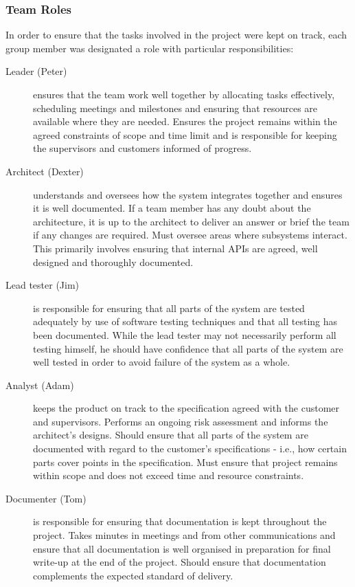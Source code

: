 \subsubsection{Team Roles}

In order to ensure that the tasks involved in the project were kept on track, each group member was designated a role with particular responsibilities:

\begin{description}
\item[Leader (Peter)] ensures that the team work well together by allocating tasks effectively, scheduling meetings and milestones and ensuring that resources are available where they are needed. Ensures the project remains within the agreed constraints of scope and time limit and is responsible for keeping the supervisors and customers informed of progress.
\item[Architect (Dexter)] understands and oversees how the system integrates together and ensures it is well documented. If a team member has any doubt about the architecture, it is up to the architect to deliver an answer or brief the team if any changes are required. Must oversee areas where subsystems interact. This primarily involves ensuring that internal APIs are agreed, well designed and thoroughly documented.
\item[Lead tester (Jim)] is responsible for ensuring that all parts of the system are tested adequately by use of software testing techniques and that all testing has been documented. While the lead tester may not necessarily perform all testing himself, he should have confidence that all parts of the system are well tested in order to avoid failure of the system as a whole.
\item[Analyst (Adam)] keeps the product on track to the specification agreed with the customer and supervisors. Performs an ongoing risk assessment and informs the architect's designs. Should ensure that all parts of the system are documented with regard to the customer's specifications - i.e., how certain parts cover points in the specification. Must ensure that project remains within scope and does not exceed time and resource constraints.
\item[Documenter (Tom)] is responsible for ensuring that documentation is kept throughout the project. Takes minutes in meetings and from other communications and ensure that all documentation is well organised in preparation for final write-up at the end of the project. Should ensure that documentation complements the expected standard of delivery.
\end{description}

